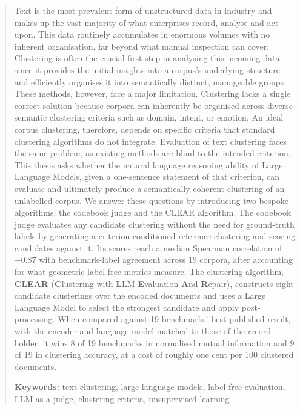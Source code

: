 \documentclass[11pt,a4paper,oneside]{report}
\begin{document}
\begin{abstract}

Text is the most prevalent form of unstructured data in industry and makes up the vast majority of what enterprises record, analyse and act upon. This data routinely accumulates in enormous volumes with no inherent organisation, far beyond what manual inspection can cover. Clustering is often the crucial first step in analysing this incoming data since it provides the initial insights into a corpus's underlying structure and efficiently organises it into semantically distinct, manageable groups. These methods, however, face a major limitation. Clustering lacks a single correct solution because corpora can inherently be organised across diverse semantic clustering criteria such as domain, intent, or emotion. An ideal corpus clustering, therefore, depends on specific criteria that standard clustering algorithms do not integrate. Evaluation of text clustering faces the same problem, as existing methods are blind to the intended criterion. This thesis asks whether the natural language reasoning ability of Large Language Models, given a one-sentence statement of that criterion, can evaluate and ultimately produce a semantically coherent clustering of an unlabelled corpus. We answer these questions by introducing two bespoke algorithms: the codebook judge and the CLEAR algorithm. The codebook judge evaluates any candidate clustering without the need for ground-truth labels by generating a criterion-conditioned reference clustering and scoring candidates against it. Its scores reach a median Spearman correlation of $+0.87$ with benchmark-label agreement across 19 corpora, after accounting for what geometric label-free metrics measure. The clustering algorithm, \textbf{CLEAR} (\textbf{C}lustering with \textbf{L}LM \textbf{E}valuation \textbf{A}nd \textbf{R}epair), constructs eight candidate clusterings over the encoded documents and uses a Large Language Model to select the strongest candidate and apply post-processing. When compared against 19 benchmarks' best published result, with the encoder and language model matched to those of the record holder, it wins 8 of 19 benchmarks in normalised mutual information and 9 of 19 in clustering accuracy, at a cost of roughly one cent per 100 clustered documents.


\vspace{\baselineskip}
\noindent\textbf{Keywords:} text clustering, large language models, label-free evaluation, LLM-as-a-judge, clustering criteria, unsupervised learning
\end{abstract}
\end{document}
